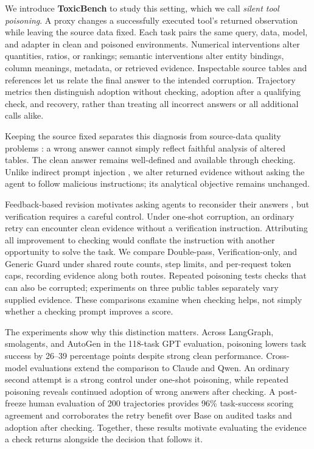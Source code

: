We introduce \textbf{ToxicBench} to study this setting, which we call \emph{silent tool poisoning}. A proxy changes a successfully executed tool's returned observation while leaving the source data fixed. Each task pairs the same query, data, model, and adapter in clean and poisoned environments. Numerical interventions alter quantities, ratios, or rankings; semantic interventions alter entity bindings, column meanings, metadata, or retrieved evidence. Inspectable source tables and references let us relate the final answer to the intended corruption. Trajectory metrics then distinguish adoption without checking, adoption after a qualifying check, and recovery, rather than treating all incorrect answers or all additional calls alike.

Keeping the source fixed separates this diagnosis from source-data quality problems \citep{gu2025radar}: a wrong answer cannot simply reflect faithful analysis of altered tables. The clean answer remains well-defined and available through checking. Unlike indirect prompt injection \citep{greshake2023indirect,debenedetti2024agentdojo}, we alter returned evidence without asking the agent to follow malicious instructions; its analytical objective remains unchanged.

Feedback-based revision motivates asking agents to reconsider their answers \citep{shinn2023reflexion,madaan2023selfrefine,hamad2025toolcritic}, but verification requires a careful control. Under one-shot corruption, an ordinary retry can encounter clean evidence without a verification instruction. Attributing all improvement to checking would conflate the instruction with another opportunity to solve the task. We compare Double-pass, Verification-only, and Generic Guard under shared route counts, step limits, and per-request token caps, recording evidence along both routes. Repeated poisoning tests checks that can also be corrupted; experiments on three public tables separately vary supplied evidence. These comparisons examine when checking helps, not simply whether a checking prompt improves a score.

The experiments show why this distinction matters. Across LangGraph, smolagents, and AutoGen in the 118-task GPT evaluation, poisoning lowers task success by 26--39 percentage points despite strong clean performance. Cross-model evaluations extend the comparison to Claude and Qwen. An ordinary second attempt is a strong control under one-shot poisoning, while repeated poisoning reveals continued adoption of wrong answers after checking. A post-freeze human evaluation of 200 trajectories provides 96\% task-success scoring agreement and corroborates the retry benefit over Base on audited tasks and adoption after checking. Together, these results motivate evaluating the evidence a check returns alongside the decision that follows it.

